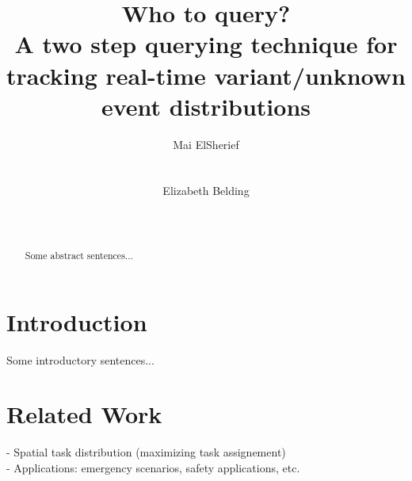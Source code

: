 \documentclass{acm_proc_article-sp}
\begin{document}
\title{Who to query? \\A two step querying technique for tracking real-time variant/unknown event distributions }

\author{
%
%
\alignauthor
Mai ElSherief\\
      \\
      \\
\alignauthor
Elizabeth Belding\\
     \\
      \\
}

\maketitle


\begin{abstract}
Some abstract sentences...

\end{abstract}


\section{Introduction}
Some introductory sentences...

\section{Related Work}
- Spatial task distribution (maximizing task assignement)\\
- Applications: emergency scenarios, safety applications, etc. 
\end{document}
